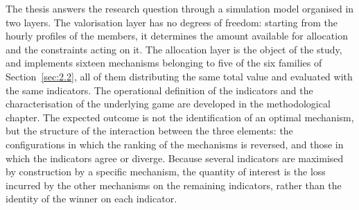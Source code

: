 The thesis answers the research question through a simulation model organised in two layers. The valorisation layer has no degrees of freedom: starting from the hourly profiles of the members, it determines the amount available for allocation and the constraints acting on it. The allocation layer is the object of the study, and implements sixteen mechanisms belonging to five of the six families of Section~\ref{sec:2.2}, all of them distributing the same total value and evaluated with the same indicators. The operational definition of the indicators and the characterisation of the underlying game are developed in the methodological chapter. The expected outcome is not the identification of an optimal mechanism, but the structure of the interaction between the three elements: the configurations in which the ranking of the mechanisms is reversed, and those in which the indicators agree or diverge. Because several indicators are maximised by construction by a specific mechanism, the quantity of interest is the loss incurred by the other mechanisms on the remaining indicators, rather than the identity of the winner on each indicator.

